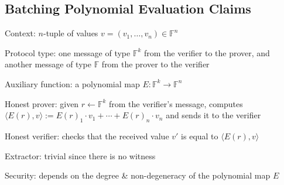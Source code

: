 \subsection{Batching Polynomial Evaluation Claims}

Context: $n$-tuple of values $v = (v_1, \ldots, v_n) \in \mathbb{F}^n$

Protocol type: one message of type $\mathbb{F}^k$ from the verifier to the prover, and another message of type $\mathbb{F}$ from the prover to the verifier

Auxiliary function: a polynomial map $E : \mathbb{F}^k \to \mathbb{F}^n$

Honest prover: given $r \gets \mathbb{F}^k$ from the verifier's message, computes $\langle E(r), v\rangle := E(r)_1 \cdot v_1 + \cdots + E(r)_n \cdot v_n$ and sends it to the verifier

Honest verifier: checks that the received value $v'$ is equal to $\langle E(r), v\rangle$

Extractor: trivial since there is no witness

Security: depends on the degree \& non-degeneracy of the polynomial map $E$


